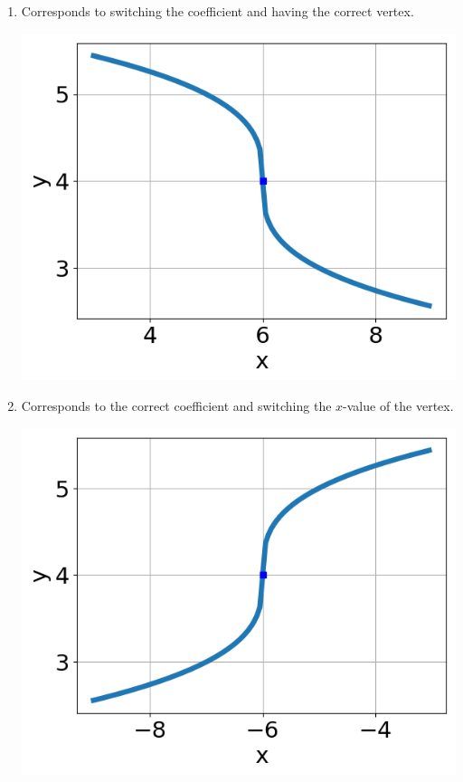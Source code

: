 \documentclass{article}[10pt]
\begin{document}
\begin{enumerate}[label=\Alph*.]
\item Corresponds to switching the coefficient and having the correct vertex. 
\begin{center}\includegraphics[scale=0.5]{../Figures/question23MUB.png}\end{center} 
 
\item Corresponds to the correct coefficient and switching the $x$-value of the vertex. 
\begin{center}\includegraphics[scale=0.5]{../Figures/question23MUC.png}\end{center} 
 

\end{enumerate}
\end{document}
